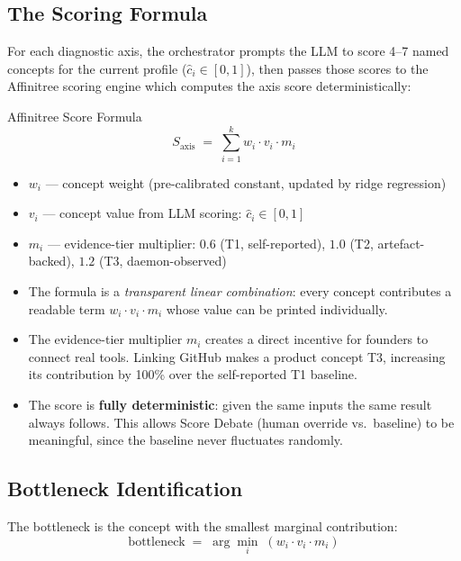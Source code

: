 \documentclass[11pt,a4paper]{article}
\begin{document}
\subsection{The Scoring Formula}

For each diagnostic axis, the orchestrator prompts the LLM to score 4–7 named concepts
for the current profile ($\hat{c}_i \in [0,1]$), then passes those scores to the
Affinitree scoring engine which computes the axis score deterministically:

\begin{mathbox}{Affinitree Score Formula}
\[
  S_\text{axis} \;=\; \sum_{i=1}^{k} w_i \cdot v_i \cdot m_i
\]
\begin{itemize}
  \item $w_i$ — concept weight (pre-calibrated constant, updated by ridge regression)
  \item $v_i$ — concept value from LLM scoring: $\hat{c}_i \in [0,1]$
  \item $m_i$ — evidence-tier multiplier: $0.6$ (T1, self-reported),
        $1.0$ (T2, artefact-backed), $1.2$ (T3, daemon-observed)
\end{itemize}
\end{mathbox}

\begin{itemize}
  \item The formula is a \emph{transparent linear combination}: every concept contributes
        a readable term $w_i \cdot v_i \cdot m_i$ whose value can be printed individually.
  \item The evidence-tier multiplier $m_i$ creates a direct incentive for founders to
        connect real tools. Linking GitHub makes a product concept T3, increasing its
        contribution by 100\% over the self-reported T1 baseline.
  \item The score is \textbf{fully deterministic}: given the same inputs the same result
        always follows. This allows Score Debate (human override vs.\ baseline) to be
        meaningful, since the baseline never fluctuates randomly.
\end{itemize}

\subsection{Bottleneck Identification}

The bottleneck is the concept with the smallest marginal contribution:
\[
  \text{bottleneck} \;=\; \arg\min_{i} \; (w_i \cdot v_i \cdot m_i)
\]
\end{document}
